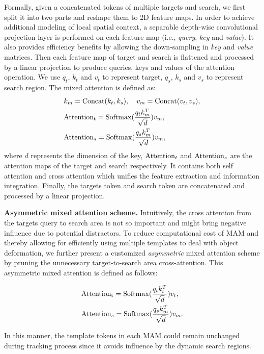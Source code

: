 Formally, given a concatenated tokens of multiple targets and search, we first split it into two parts and reshape them to 2D feature maps. In order to achieve additional modeling of local spatial context, a separable depth-wise convolutional projection layer is performed on each feature map (i.e., \emph{query}, \emph{key} and \emph{value}). It also provides efficiency benefits by allowing the down-sampling in \emph{key} and \emph{value} matrices. Then each feature map of target and search is flattened and processed by a linear projection to produce queries, keys and values of the attention operation. We use $q_t$, $k_t$ and $v_t$ to represent target, $q_s$, $k_s$ and $v_s$ to represent search region. The mixed attention is defined as: 
\begin{equation}
\vspace{-2mm}
\begin{aligned}
    & k_m = {\rm Concat}(k_t, k_s), \ \ \ v_m = {\rm Concat}(v_t, v_s), \\ 
    & {\rm Attention_{t}} = {\rm Softmax}(\frac{q_{t}k_{m}^{T}}{\sqrt{d}})v_{m},\\
    & {\rm Attention}_{s} = {\rm Softmax}(\frac{q_{s}k_{m}^{T}}{\sqrt{d}})v_{m},
\end{aligned}
\end{equation}
where $d$ represents the dimension of the key, ${\rm Attention}_{t}$ and ${\rm Attention}_{s}$ are the attention maps of the target and search respectively. It contains both self attention and cross attention which unifies the feature extraction and information integration. Finally, the targets token and search token are concatenated and processed by a linear projection.

\noindent \textbf{Asymmetric mixed attention scheme.} Intuitively, the cross attention from the targets query to search area is not so important and might bring negative influence due to potential distractors. To reduce computational cost of MAM and thereby allowing for efficiently using multiple templates to deal with object deformation, we further present a customized {\em asymmetric} mixed attention scheme by pruning the unnecessary target-to-search area cross-attention. This asymmetric mixed attention is defined as follows:
\begin{small}
\begin{equation}
\vspace{-1mm}
\begin{aligned}
    & {\rm Attention_{t}} = {\rm Softmax}(\frac{q_{t}k_{t}^{T}}{\sqrt{d}})v_{t}, \\
    & {\rm Attention}_{s} = {\rm Softmax}(\frac{q_{s}k_{m}^{T}}{\sqrt{d}})v_{m}.
\end{aligned}
\end{equation}
\end{small}
In this manner, the template tokens in each MAM could remain unchanged during tracking process since it avoids influence by the dynamic search regions.

